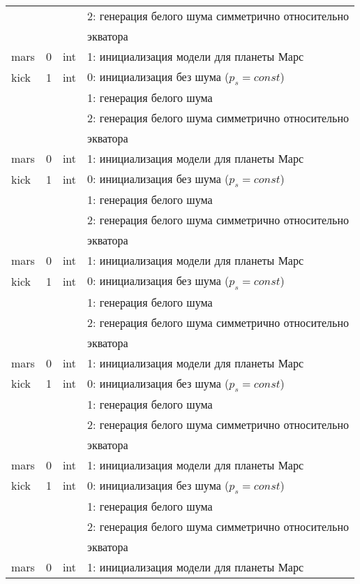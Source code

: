 \begin{longtable*}[c]{|l|c|l|l|}
      &   &     & 2: генерация белого шума симметрично относительно \\
  & & & экватора    \\
 mars & 0 & int & 1: инициализация модели для планеты Марс     \\
kick & 1 & int & 0: инициализация без шума ($p_s = const$) \\
      &   &     & 1: генерация белого шума                  \\
      &   &     & 2: генерация белого шума симметрично относительно \\
  & & & экватора    \\
 mars & 0 & int & 1: инициализация модели для планеты Марс     \\
kick & 1 & int & 0: инициализация без шума ($p_s = const$) \\
      &   &     & 1: генерация белого шума                  \\
      &   &     & 2: генерация белого шума симметрично относительно \\
  & & & экватора    \\
 mars & 0 & int & 1: инициализация модели для планеты Марс     \\
kick & 1 & int & 0: инициализация без шума ($p_s = const$) \\
      &   &     & 1: генерация белого шума                  \\
      &   &     & 2: генерация белого шума симметрично относительно \\
  & & & экватора    \\
 mars & 0 & int & 1: инициализация модели для планеты Марс     \\
kick & 1 & int & 0: инициализация без шума ($p_s = const$) \\
      &   &     & 1: генерация белого шума                  \\
      &   &     & 2: генерация белого шума симметрично относительно \\
  & & & экватора    \\
 mars & 0 & int & 1: инициализация модели для планеты Марс     \\
kick & 1 & int & 0: инициализация без шума ($p_s = const$) \\
      &   &     & 1: генерация белого шума                  \\
      &   &     & 2: генерация белого шума симметрично относительно \\
  & & & экватора    \\
 mars & 0 & int & 1: инициализация модели для планеты Марс     \\

\end{longtable*}
